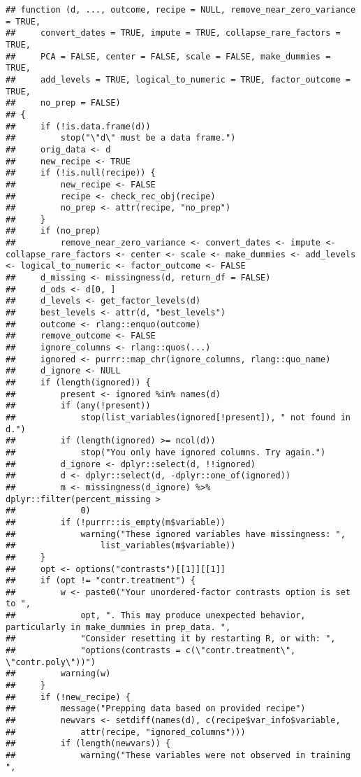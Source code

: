 \documentclass[
]{article}
\begin{document}
\begin{verbatim}
## function (d, ..., outcome, recipe = NULL, remove_near_zero_variance = TRUE, 
##     convert_dates = TRUE, impute = TRUE, collapse_rare_factors = TRUE, 
##     PCA = FALSE, center = FALSE, scale = FALSE, make_dummies = TRUE, 
##     add_levels = TRUE, logical_to_numeric = TRUE, factor_outcome = TRUE, 
##     no_prep = FALSE) 
## {
##     if (!is.data.frame(d)) 
##         stop("\"d\" must be a data frame.")
##     orig_data <- d
##     new_recipe <- TRUE
##     if (!is.null(recipe)) {
##         new_recipe <- FALSE
##         recipe <- check_rec_obj(recipe)
##         no_prep <- attr(recipe, "no_prep")
##     }
##     if (no_prep) 
##         remove_near_zero_variance <- convert_dates <- impute <- collapse_rare_factors <- center <- scale <- make_dummies <- add_levels <- logical_to_numeric <- factor_outcome <- FALSE
##     d_missing <- missingness(d, return_df = FALSE)
##     d_ods <- d[0, ]
##     d_levels <- get_factor_levels(d)
##     best_levels <- attr(d, "best_levels")
##     outcome <- rlang::enquo(outcome)
##     remove_outcome <- FALSE
##     ignore_columns <- rlang::quos(...)
##     ignored <- purrr::map_chr(ignore_columns, rlang::quo_name)
##     d_ignore <- NULL
##     if (length(ignored)) {
##         present <- ignored %in% names(d)
##         if (any(!present)) 
##             stop(list_variables(ignored[!present]), " not found in d.")
##         if (length(ignored) >= ncol(d)) 
##             stop("You only have ignored columns. Try again.")
##         d_ignore <- dplyr::select(d, !!ignored)
##         d <- dplyr::select(d, -dplyr::one_of(ignored))
##         m <- missingness(d_ignore) %>% dplyr::filter(percent_missing > 
##             0)
##         if (!purrr::is_empty(m$variable)) 
##             warning("These ignored variables have missingness: ", 
##                 list_variables(m$variable))
##     }
##     opt <- options("contrasts")[[1]][[1]]
##     if (opt != "contr.treatment") {
##         w <- paste0("Your unordered-factor contrasts option is set to ", 
##             opt, ". This may produce unexpected behavior, particularly in make_dummies in prep_data. ", 
##             "Consider resetting it by restarting R, or with: ", 
##             "options(contrasts = c(\"contr.treatment\", \"contr.poly\"))")
##         warning(w)
##     }
##     if (!new_recipe) {
##         message("Prepping data based on provided recipe")
##         newvars <- setdiff(names(d), c(recipe$var_info$variable, 
##             attr(recipe, "ignored_columns")))
##         if (length(newvars)) {
##             warning("These variables were not observed in training ", 

\end{verbatim}
\end{document}
